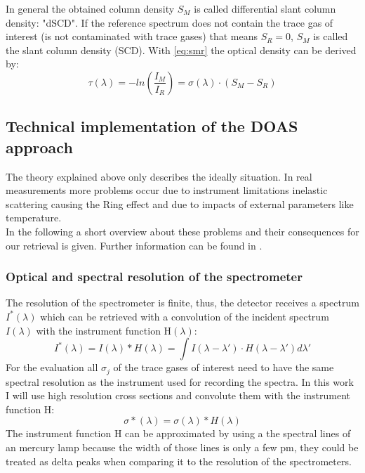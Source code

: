 \documentclass  [
  paper    = a4,
  BCOR     = 10mm,
  twoside,
  fontsize = 12pt,
  fleqn,
  toc      = bibnumbered,
  toc      = listofnumbered,
  numbers  = noendperiod,
  headings = normal,
  listof   = leveldown,
  version  = 3.03
]                                       {scrreprt}
\begin{document}
	In general the obtained column density $S_{M}$ is called differential slant column density: "dSCD". If the reference spectrum does not contain the trace gas of interest (is not contaminated with trace gases) that means $S_{R} = 0$, $S_{M}$ is called the slant column	density (SCD). 
	With \cref{eq:smr} the optical density can be derived by:
	\begin{equation}
	\tau\left(\lambda\right) = -ln\left(\frac{I_{M}}{I_{R}}\right) = \sigma\left(\lambda\right)\cdot\left(S_{M}-S_{R}\right)
	\end{equation}
	
	
	\subsection{Technical implementation of the DOAS approach}
	The theory explained above only describes the ideally situation. In real measurements more problems occur due to instrument limitations inelastic scattering causing the Ring effect and due to impacts of external parameters like temperature.\\
	In the following a short overview about these problems and their consequences for our retrieval is given. Further information can be found in \citet{lubcke2014optical}.\\
	\subsubsection*{Optical and spectral resolution of the spectrometer}
	The resolution of the spectrometer is finite, thus, the detector receives a spectrum $I^{*}\left(\lambda\right)$ which can be retrieved with a convolution of the incident spectrum $I\left(\lambda\right)$ with the instrument function H$\left(\lambda\right)$:
	\begin{equation}
	I^{*}\left(\lambda\right) = I\left(\lambda\right)*H\left(\lambda\right)=\int I\left(\lambda-\lambda{'}\right)\cdot H\left(\lambda-\lambda{'}\right)d\lambda{'}
	\end{equation} 
	For the evaluation all $\sigma_{j}$  of the trace gases of interest need to have the same spectral resolution as the instrument used for recording the spectra. In this work I will use high resolution cross sections and convolute them with the instrument function H:
	\begin{equation}
	\sigma{*}\left(\lambda\right) = \sigma\left(\lambda\right)*H\left(\lambda\right)
	\end{equation}
	The instrument function H can be approximated by using a the spectral lines of an mercury lamp because the width of those lines is only a few pm, they could be treated as delta peaks when comparing it to the resolution of the spectrometers.
	
\end{document}
